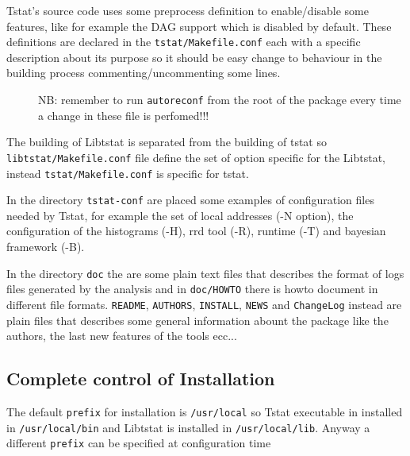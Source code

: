 \documentclass[11pt]{article}
\begin{document}
Tstat's source code uses some preprocess definition to enable/disable some features,
like for example the DAG support which is disabled by default.
These definitions are declared in the \texttt{tstat/Makefile.conf} each with a specific 
description about its purpose so it should be easy change to behaviour in the building
process commenting/uncommenting some lines.

\begin{description}

\item[{}] \mbox{}

NB: remember to run \texttt{autoreconf} from the root of the package every time 
a change in these file is perfomed!!!

\end{description}


The building of Libtstat is separated from the building of tstat so \texttt{libtstat/Makefile.conf}
file define the set of option specific for the Libtstat, instead \texttt{tstat/Makefile.conf}
is specific for tstat.



In the directory \texttt{tstat-conf} are placed some examples of configuration files 
needed by Tstat, for example the set of local addresses (-N option), 
the configuration of the histograms (-H), rrd tool (-R), runtime (-T) and 
bayesian framework (-B).



In the directory \texttt{doc} the are some plain text files that describes the format
of logs files generated by the analysis and in \texttt{doc/HOWTO} there is howto document 
in different file formats.
\texttt{README}, \texttt{AUTHORS}, \texttt{INSTALL}, \texttt{NEWS} and \texttt{ChangeLog} instead are plain files that
describes some general information abount the package like the authors, the last new
features of the tools ecc...

\subsection{Complete control of Installation\label{Complete_control_of_Installation}}


The default \texttt{prefix} for installation is \texttt{/usr/local} so
Tstat executable in installed in \texttt{/usr/local/bin} and Libtstat 
is installed in \texttt{/usr/local/lib}. Anyway a different \texttt{prefix} can
be specified at configuration time
\end{document}
